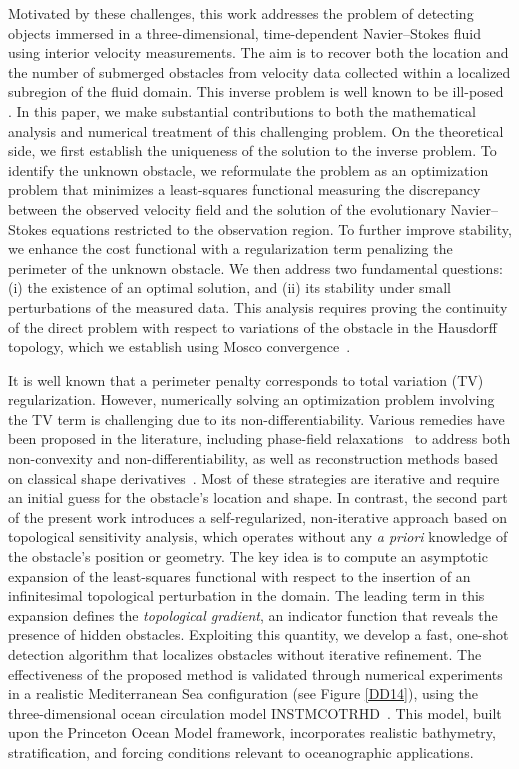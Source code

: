 \documentclass[a4paper,12pt,reqno,natbib]{amsart}
\begin{document}
Motivated by these challenges, this work addresses the problem of detecting objects immersed in a three-dimensional, time-dependent Navier--Stokes fluid using interior velocity measurements. The aim is to recover both the location and the number of submerged obstacles from velocity data collected within a localized subregion of the fluid domain. This inverse problem is well known to be ill-posed \cite{AlvarezIPPIP2005}.  In this paper, we make substantial contributions to both the mathematical analysis and numerical treatment of this challenging problem. On the theoretical side, we first establish the uniqueness of the solution to the inverse problem. To identify the unknown obstacle, we reformulate the problem as an optimization problem that minimizes a least-squares functional measuring the discrepancy between the observed velocity field and the solution of the evolutionary Navier--Stokes equations restricted to the observation region. To further improve stability, we enhance the cost functional with a regularization term penalizing the perimeter of the unknown obstacle.  We then address two fundamental questions: (i) the existence of an optimal solution, and (ii) its stability under small perturbations of the measured data. This analysis requires proving the continuity of the direct problem with respect to variations of the obstacle in the Hausdorff topology, which we establish using Mosco convergence~\cite{BucurBook2005,bucur2001continuity}.

It is well known that a perimeter penalty corresponds to total variation (TV) regularization. However, numerically solving an optimization problem involving the TV term is challenging due to its non-differentiability. Various remedies have been proposed in the literature, including phase-field relaxations~\cite{aspri2022phase,beretta2018detection,bourdin2003design,rondi2011reconstruction} to address both non-convexity and non-differentiability, as well as reconstruction methods based on classical shape derivatives~\cite{afraites2022new,afraites2022coupled,DelfourBook2001,HenrotBook2005,SokolowskiBook1992}. Most of these strategies are iterative and require an initial guess for the obstacle’s location and shape. In contrast, the second part of the present work introduces a self-regularized, non-iterative approach based on topological sensitivity analysis, which operates without any \emph{a priori} knowledge of the obstacle’s position or geometry. The key idea is to compute an asymptotic expansion of the least-squares functional with respect to the insertion of an infinitesimal topological perturbation in the domain. The leading term in this expansion defines the \emph{topological gradient}, an indicator function that reveals the presence of hidden obstacles. Exploiting this quantity, we develop a fast, one-shot detection algorithm that localizes obstacles without iterative refinement. The effectiveness of the proposed method is validated through numerical experiments in a realistic Mediterranean Sea configuration (see Figure \ref{DD14}), using the three-dimensional ocean circulation model INSTMCOTRHD~\cite{alioua,marwa}. This model, built upon the Princeton Ocean Model framework, incorporates realistic bathymetry, stratification, and forcing conditions relevant to oceanographic applications.
\end{document}
